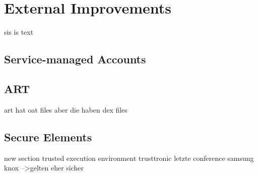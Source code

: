 \section{External Improvements} \label{section:evaluation-setion}
sis is text
\subsection{Service-managed Accounts}
\subsection{ART}
art hat oat files aber die haben dex files
\subsection{Secure Elements}


new section trusted execution environment
trusttronic letzte conference
samsung knox
-->gelten eher sicher
